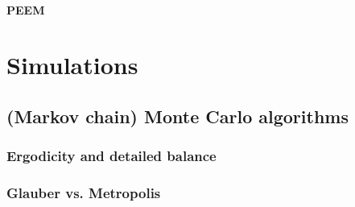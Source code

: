 \paragraph{PEEM}

\section{Simulations}\label{sec:sim}
\subsection{(Markov chain) Monte Carlo algorithms}
\subsubsection{Ergodicity and detailed balance}
\subsubsection{Glauber vs. Metropolis}
